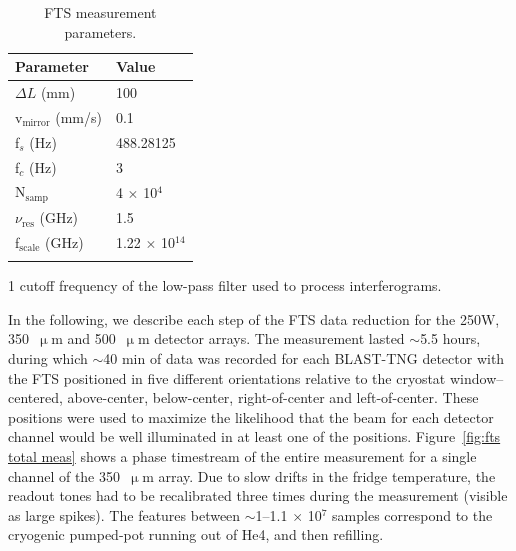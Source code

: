 \begin{table}[!htbp]
\caption[~FTS measurement parameters.]{FTS measurement parameters.}
  \centering
\begin{threeparttable}
\begin{tabular}{@{}ll@{}}
\dtoprule{}
Parameter & Value \\ \midrule
$\Delta L$ (mm) & 100 \\
v$_{\mathrm{mirror}}$ (mm/s) & 0.1 \\
f$_{s}$ (Hz) & 488.28125 \\
f$_{c}$\tnote{1} (Hz) & 3 \\
N$_{\mathrm{samp}}$ & 4 $\times$ 10$^{4}$ \\
$\nu_{\mathrm{res}}$ (GHz) & 1.5 \\
f$_{\mathrm{scale}}$ (GHz) & 1.22 $\times$ 10$^{14}$ \\ \dbottomrule{}
\end{tabular}
\begin{tablenotes}
\item [1] cutoff frequency of the low-pass filter used to process interferograms.
\vspace{2mm}
\end{tablenotes}
\label{table:fts params}
\end{threeparttable}
\end{table}

In the following, we describe each step of the FTS data reduction for the 250W, 350~$\upmu$m and 500~$\upmu$m detector arrays. The measurement lasted $\sim$5.5 hours, during which $\sim$40 min of data was recorded for each BLAST-TNG detector with the FTS positioned in five different orientations relative to the cryostat window-- centered, above-center, below-center, right-of-center and left-of-center. These positions were used to maximize the likelihood that the beam for each detector channel would be well illuminated in at least one of the positions. Figure~\ref{fig:fts total meas} shows a phase timestream of the entire measurement for a single channel of the 350~$\upmu$m array. Due to slow drifts in the fridge temperature, the readout tones had to be recalibrated three times during the measurement (visible as large spikes). The features between $\sim$1--1.1 $\times$ 10$^{7}$ samples correspond to the cryogenic pumped-pot running out of He4, and then refilling.


